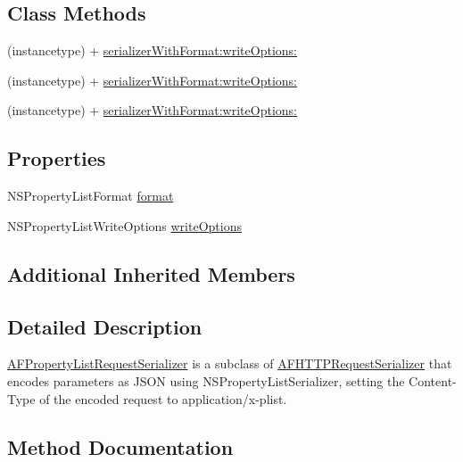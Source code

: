\subsection*{Class Methods}
\begin{DoxyCompactItemize}
\item 
(instancetype) + \mbox{\hyperlink{interface_a_f_property_list_request_serializer_aa8620db96210cdd972538da3b5954c85}{serializer\+With\+Format\+:write\+Options\+:}}
\item 
(instancetype) + \mbox{\hyperlink{interface_a_f_property_list_request_serializer_aa8620db96210cdd972538da3b5954c85}{serializer\+With\+Format\+:write\+Options\+:}}
\item 
(instancetype) + \mbox{\hyperlink{interface_a_f_property_list_request_serializer_aa8620db96210cdd972538da3b5954c85}{serializer\+With\+Format\+:write\+Options\+:}}
\end{DoxyCompactItemize}
\subsection*{Properties}
\begin{DoxyCompactItemize}
\item 
N\+S\+Property\+List\+Format \mbox{\hyperlink{interface_a_f_property_list_request_serializer_a7caf5c4c62553db952c3f8dca8cf5b5f}{format}}
\item 
N\+S\+Property\+List\+Write\+Options \mbox{\hyperlink{interface_a_f_property_list_request_serializer_a15d74e1c93bc158815a46aa351e6fb79}{write\+Options}}
\end{DoxyCompactItemize}
\subsection*{Additional Inherited Members}


\subsection{Detailed Description}
{\ttfamily \mbox{\hyperlink{interface_a_f_property_list_request_serializer}{A\+F\+Property\+List\+Request\+Serializer}}} is a subclass of {\ttfamily \mbox{\hyperlink{interface_a_f_h_t_t_p_request_serializer}{A\+F\+H\+T\+T\+P\+Request\+Serializer}}} that encodes parameters as J\+S\+ON using {\ttfamily N\+S\+Property\+List\+Serializer}, setting the {\ttfamily Content-\/\+Type} of the encoded request to {\ttfamily application/x-\/plist}. 

\subsection{Method Documentation}
\mbox{\label{interface_a_f_property_list_request_serializer_aa8620db96210cdd972538da3b5954c85}} 
